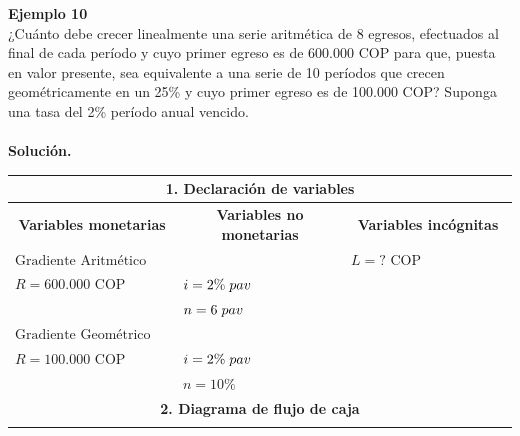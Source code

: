 \textbf{Ejemplo 10}\\
¿Cuánto debe crecer linealmente una serie
aritmética de 8 egresos, efectuados al final de cada período y cuyo primer egreso es de 600.000 COP para
que, puesta en valor presente, sea equivalente a una serie de 10 períodos que crecen
geométricamente en un 25\% y cuyo primer egreso es de  100.000 COP? Suponga una tasa del 2\% período
anual vencido.\\ \\
\textbf{Solución.}\\
\begin{center}
  \renewcommand{\arraystretch}{1.5}%
  \begin{longtable}[H]{|p{0.333\linewidth}|p{0.3333\linewidth}|p{0.3333\linewidth}|}
    \hline
    \multicolumn{3}{|c|}{\cellcolor[HTML]{FFB183}\textbf{1. Declaración de variables}}                 \\ \hline
    \multicolumn{1}{|c|}{\cellcolor[HTML]{FFB183}\textbf{Variables monetarias}}                   & \multicolumn{1}{|c|}{\cellcolor[HTML]{FFB183}\textbf{Variables no monetarias}}                   & \multicolumn{1}{|c|}{\cellcolor[HTML]{FFB183}\textbf{Variables incógnitas}}                                                                         \\ \hline
	$\text{Gradiente Aritmético}$ &   & $L = ? $ COP         \\
    $R =  600{.}000 $ COP    &   $i=2\% \hspace{1mm} pav$ &                       \\
                             &   $n=6 \hspace{1mm} pav$   &                       \\
    $\text{Gradiente Geométrico}$ &   &                        \\
    $R =  100{.}000 $ COP    & $i=2\% \hspace{1mm} pav$   &                         \\
                             & $n= 10\%$ &                                                                                     \\ \hline
    \multicolumn{3}{|c|}{\cellcolor[HTML]{FFB183}\textbf{2. Diagrama de flujo de caja}}                \\ \hline
    \multicolumn{3}{|p{\columnwidth}|}{ 
}
\end{longtable}
\end{center}
